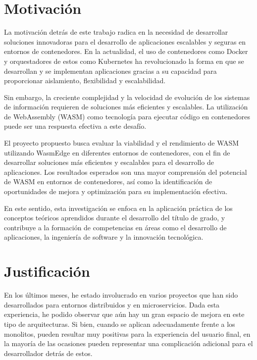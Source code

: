 \section{Motivación}

La motivación detrás de este trabajo radica en la necesidad de desarrollar soluciones innovadoras para el desarrollo de aplicaciones escalables y seguras en entornos de contenedores. En la actualidad, el uso de contenedores como Docker y orquestadores de estos como Kubernetes ha revolucionado la forma en que se desarrollan y se implementan aplicaciones gracias a su capacidad para proporcionar aislamiento, flexibilidad y escalabilidad.

Sin embargo, la creciente complejidad y la velocidad de evolución de los sistemas de información requieren de soluciones más eficientes y escalables. La utilización de WebAssembly (WASM) como tecnología para ejecutar código en contenedores puede ser una respuesta efectiva a este desafío.

El proyecto propuesto busca evaluar la viabilidad y el rendimiento de WASM utilizando WasmEdge en diferentes entornos de contenedores, con el fin de desarrollar soluciones más eficientes y escalables para el desarrollo de aplicaciones. Los resultados esperados son una mayor comprensión del potencial de WASM en entornos de contenedores, así como la identificación de oportunidades de mejora y optimización para su implementación efectiva.

En este sentido, esta investigación se enfoca en la aplicación práctica de los conceptos teóricos aprendidos durante el desarrollo del título de grado, y contribuye a la formación de competencias en áreas como el desarrollo de aplicaciones, la ingeniería de software y la innovación tecnológica.

\section{Justificación}

En los últimos meses, he estado involucrado en varios proyectos que han sido desarrollados para entornos distribuidos y en microservicios. Dada esta experiencia, he podido observar que aún hay un gran espacio de mejora en este tipo de arquitecturas. Si bien, cuando se aplican adecuadamente frente a los monolitos, pueden resultar muy positivas para la experiencia del usuario final, en la mayoría de las ocasiones pueden representar una complicación adicional para el desarrollador detrás de estos.

